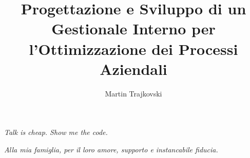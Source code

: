 \documentclass{theme/uniprthesis}
\title{Progettazione e Sviluppo di un Gestionale Interno per l'Ottimizzazione dei Processi Aziendali}
\author{Martin Trajkovski}
\newcommand\blankpage{
    \null
    \thispagestyle{empty}
    \addtocounter{page}{-1}
    \newpage
}
\begin{document}
\maketitle
\blankpage

\newpage
\thispagestyle{empty}
\null{}
\begin{flushright}
	\textit{Talk is cheap. Show me the code.}
\end{flushright}
\null
\newpage
\blankpage

\newpage
\thispagestyle{empty}
\null{}
\begin{flushright}
	\textit{Alla mia famiglia, per il loro amore, supporto e instancabile fiducia. }
\end{flushright}
\null
\newpage
\blankpage

\tableofcontents


	
\pagestyle{fancy}




\pagestyle{plain}


\pagestyle{plain}




\newpage
\thispagestyle{empty}
\null{}
\null
\newpage

\blankpage
\end{document}
